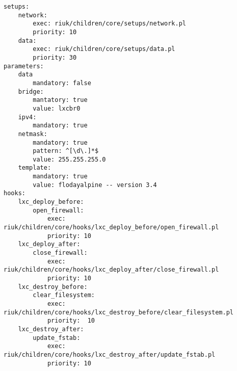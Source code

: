 \begin{lstlisting}[caption={config.yml}, label=fig_1.3_config]
setups:
	network:
		exec: riuk/children/core/setups/network.pl
		priority: 10
	data:
		exec: riuk/children/core/setups/data.pl
		priority: 30
parameters:
	data
		mandatory: false
	bridge:
		mantatory: true
		value: lxcbr0
	ipv4:
		mandatory: true
	netmask:
		mandatory: true
		pattern: ^[\d\.]*$
		value: 255.255.255.0
	template:
		mandatory: true
		value: flodayalpine -- version 3.4
hooks:
	lxc_deploy_before:
		open_firewall:
			exec: riuk/children/core/hooks/lxc_deploy_before/open_firewall.pl
			priority: 10
	lxc_deploy_after:
		close_firewall:
			exec: riuk/children/core/hooks/lxc_deploy_after/close_firewall.pl
			priority: 10
	lxc_destroy_before:
		clear_filesystem:
			exec: riuk/children/core/hooks/lxc_destroy_before/clear_filesystem.pl
			priority:  10
	lxc_destroy_after:
		update_fstab:
			exec: riuk/children/core/hooks/lxc_destroy_after/update_fstab.pl
			priority: 10
\end{lstlisting}
